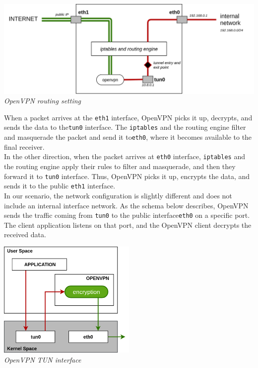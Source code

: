 \documentclass[12pt]{article}
\begin{document}
	\bigbreak
	\begin{center}
		\includegraphics[width=1\textwidth]{images/openvpn_routing_setup.png}\\
		\small{\textit{OpenVPN routing setting}}
	\end{center}
	\bigbreak
	When a packet arrives at the \lstinline{eth1} interface, OpenVPN picks it up, decrypts, and sends the data to the\lstinline{tun0} interface. The \lstinline{iptables} and the routing engine filter and masquerade the packet and send it to\lstinline{eth0}, where it becomes available to the final receiver.\\
	In the other direction, when the packet arrives at \lstinline{eth0} interface, \lstinline{iptables} and the routing engine apply their rules to filter and masquerade, and then they forward it to \lstinline{tun0} interface. Thus, OpenVPN picks it up, encrypts the data, and sends it to the public \lstinline{eth1} interface.\\
	In our scenario, the network configuration is slightly different and does not include an internal interface network. As the schema below describes, OpenVPN sends the traffic coming from \lstinline{tun0} to the public interface\lstinline{eth0} on a specific port. The client application listens on that port, and the OpenVPN client decrypts the received data.\\
	\bigbreak

	\begin{center}
		\includegraphics[width=0.5\textwidth]{images/openvpn_tun_interface.png}\\
		\small{\textit{OpenVPN TUN interface}}
	\end{center}
\end{document}
